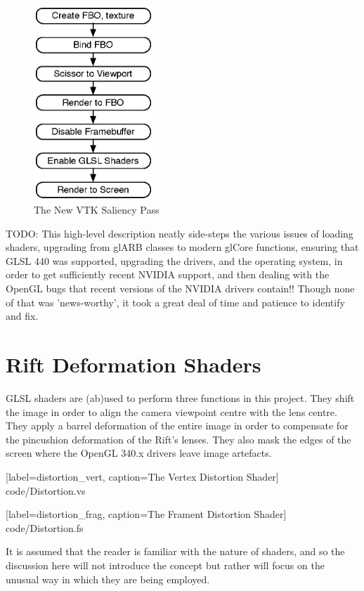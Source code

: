 \documentclass[MSc,paper=a4,pagesize=auto]{icldt}
\begin{document}
\begin{figure}[htbp!]
    \centering
    \includegraphics[width=0.4\textwidth]{resources/vtk_saliency}
    \caption{The New VTK Saliency Pass}
    \label{fig:vtk_saliency}
\end{figure}

TODO: This high-level description neatly side-steps the various issues of loading shaders, upgrading from glARB classes to modern glCore functions, ensuring that GLSL 440 was supported, upgrading the drivers, and the operating system, in order to get sufficiently recent NVIDIA support, and then dealing with the OpenGL bugs that recent versions of the NVIDIA drivers contain!! Though none of that was 'news-worthy', it took a great deal of time and patience to identify and fix. 

\section{Rift Deformation Shaders}
GLSL shaders are (ab)used to perform three functions in this project. They shift the image in order to align the camera viewpoint centre with the lens centre. They apply a barrel deformation of the entire image in order to compensate for the pincushion deformation of the Rift's lenses.  They also mask the edges of the screen where the OpenGL 340.x drivers leave image artefacts. 


  [label=distortion_vert, caption=The Vertex Distortion Shader]
  {code/Distortion.vs}
  

  [label=distortion_frag, caption=The Frament Distortion Shader]
  {code/Distortion.fs}

It is assumed that the reader is familiar with the nature of shaders, and so the discussion here will not introduce the concept but rather will focus on the unusual way in which they are being employed. 
\end{document}
